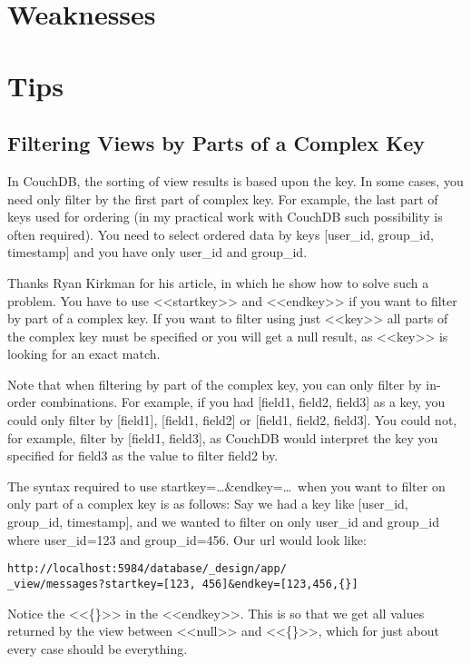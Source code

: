\section{Weaknesses}

\section{Tips}

\subsection{Filtering Views by Parts of a Complex Key}

In CouchDB, the sorting of view results is based upon the key. In some cases, you need only filter by the first part of complex key. For example, the last part of keys used for ordering (in my practical work with CouchDB such possibility is often required). You need to select ordered data by keys [user\_id, group\_id, timestamp] and you have only user\_id and group\_id.

Thanks Ryan Kirkman for his article\cite{couchdb_filtering_views}, in which he show how to solve such a problem. You have to use <<startkey>> and <<endkey>> if you want to filter by part of a complex key. If you want to filter using just <<key>> all parts of the complex key must be specified or you will get a null result, as <<key>> is looking for an exact match.

Note that when filtering by part of the complex key, you can only filter by in-order combinations. For example, if you had [field1, field2, field3] as a key, you could only filter by [field1], [field1, field2] or [field1, field2, field3]. You could not, for example, filter by [field1, field3], as CouchDB would interpret the key you specified for field3 as the value to filter field2 by.

The syntax required to use startkey=\dots\&endkey=\dots~when you want to filter on only part of a complex key is as follows:
Say we had a key like [user\_id, group\_id, timestamp], and we wanted to filter on only user\_id and group\_id where user\_id=123 and group\_id=456. Our url would look like:

\begin{lstlisting}
http://localhost:5984/database/_design/app/
_view/messages?startkey=[123, 456]&endkey=[123,456,{}]
\end{lstlisting}

Notice the <<\{\}>> in the <<endkey>>. This is so that we get all values returned by the view between <<null>> and <<\{\}>>, which for just about every case should be everything.

